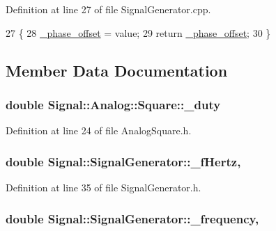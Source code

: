 Definition at line 27 of file Signal\+Generator.\+cpp.


\begin{DoxyCode}
27                                                                    \{
28     \hyperlink{classSignal_1_1SignalGenerator_a6b4444d46747c8517171edbbf4b5588f}{\_phase\_offset} = value;
29     \textcolor{keywordflow}{return} \hyperlink{classSignal_1_1SignalGenerator_a6b4444d46747c8517171edbbf4b5588f}{\_phase\_offset};
30 \}
\end{DoxyCode}


\subsection{Member Data Documentation}
\hypertarget{classSignal_1_1Analog_1_1Square_a1f2fa9d4724764f65c4491ee8b80a6be}{
\subsubsection[{\+\_\+duty}]{\setlength{\rightskip}{0pt plus 5cm}double Signal\+::\+Analog\+::\+Square\+::\+\_\+duty\hspace{0.3cm}{\ttfamily [protected]}}}\label{classSignal_1_1Analog_1_1Square_a1f2fa9d4724764f65c4491ee8b80a6be}


Definition at line 24 of file Analog\+Square.\+h.

\hypertarget{classSignal_1_1SignalGenerator_a85a4702347352bab1c71e0a8df8437d6}{
\subsubsection[{\+\_\+f\+Hertz}]{\setlength{\rightskip}{0pt plus 5cm}double Signal\+::\+Signal\+Generator\+::\+\_\+f\+Hertz\hspace{0.3cm}{\ttfamily [protected]}, {\ttfamily [inherited]}}}\label{classSignal_1_1SignalGenerator_a85a4702347352bab1c71e0a8df8437d6}


Definition at line 35 of file Signal\+Generator.\+h.

\hypertarget{classSignal_1_1SignalGenerator_a7f107461333bce68c5dad412db96a8c2}{
\subsubsection[{\+\_\+frequency}]{\setlength{\rightskip}{0pt plus 5cm}double Signal\+::\+Signal\+Generator\+::\+\_\+frequency\hspace{0.3cm}{\ttfamily [protected]}, {\ttfamily [inherited]}}}\label{classSignal_1_1SignalGenerator_a7f107461333bce68c5dad412db96a8c2}


